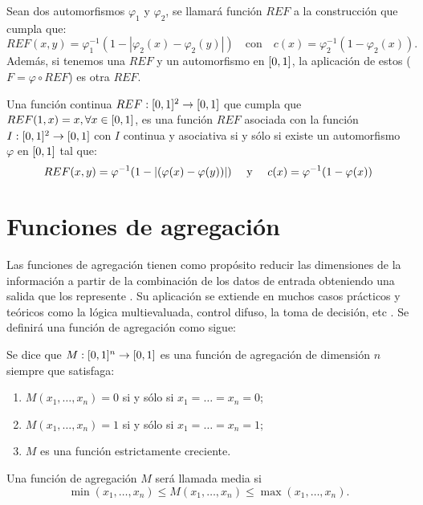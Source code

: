 \begin{proposition}\label{prop:contruccionref}
Sean dos automorfismos $\varphi_{1}$ y $\varphi_{2}$, se llamará función $REF$ a la construcción que cumpla que: 
$$REF(x,y) = \varphi_1^{-1}(1-|\varphi_2(x)-\varphi_2(y)|) \quad\text{con}\quad c(x) = \varphi_2^{-1}(1-\varphi_2(x)).$$ 
Además, si tenemos una $REF$ y un automorfismo en $[0,1]$, la aplicación de estos ($F=\varphi \circ REF$) es otra $REF$.
\end{proposition}

\begin{theorem}\label{th:ref}
Una función continua $REF:[0,1]^2 \rightarrow[0,1]$ que cumpla que $REF(1,x)=x, \forall x\in[0,1]$, es una función $REF$ asociada con la función $I:[0,1]^2\rightarrow[0,1]$ con $I$ continua y asociativa si y sólo si existe un automorfismo $\varphi$ en $[0,1]$ tal que:
$$REF(x,y)=\varphi^{-1}(1-\left\vert(\varphi(x)-\varphi(y))\right\vert)\quad\text{ y }\quad c(x)=\varphi^{-1}(1-\varphi(x))$$
\end{theorem}


\newpage

\section{Funciones de agregación}\label{sec:agregacion}
Las funciones de agregación tienen como propósito reducir las dimensiones de la información a partir de la combinación de los datos de entrada obteniendo una salida que los represente \cite{art:montero, art:calvoagregacion}. Su aplicación se extiende en muchos casos prácticos y teóricos como la lógica multievaluada, control difuso, la toma de decisión, etc \cite{art:paternain}.  Se definirá una función de agregación como sigue:

\begin{definition}\label{def:agregacion}
Se dice que $M : [0,1]^n \rightarrow [0,1]$ es una función de agregación de dimensión $n$ siempre que satisfaga:
	\begin{enumerate}
	\item $M(x_1, \dots, x_n) = 0$ si y sólo si $x_1=\dots=x_n=0$;
	\item $M(x_1, \dots, x_n) = 1$ si y sólo si $x_1=\dots=x_n=1$;
	\item $M$ es una función estrictamente creciente.
	\end{enumerate}
\end{definition}
\begin{definition}
Una función de agregación $M$ será llamada media si
$$ \min(x_{1}, \dots, x_{n})  \leq M(x_{1}, \dots, x_{n}) \leq \max(x_{1}, \dots, x_{n}).$$
\end{definition}

